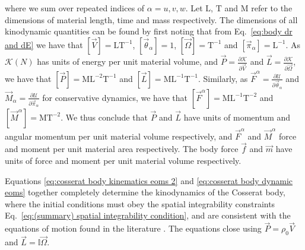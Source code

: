 where we sum over repeated indices of $\alpha = u, v, w$. Let $\mathrm{L}$, $\mathrm{T}$ and $\mathrm{M}$ refer to the dimensions of material length, time and mass respectively. The dimensions of all kinodynamic quantities can be found by first noting that from Eq.~\ref{eq:body dr and dE} we have that $[\vec{V}] = \mathrm{L} \mathrm{T}^{-1}$, $[\vec{\theta}_\alpha] = 1$, $[\vec{\Omega}] = \mathrm{T}^{-1}$ and $[\vec{\pi}_\alpha] = \mathrm{L}^{-1}$. As $\mathcal{K}(N)$ has units of energy per unit material volume, and $\vec{P} = \frac{\partial \mathcal{K}}{\partial \vec{V}}$ and $\vec{L} = \frac{\partial \mathcal{K}}{\partial \vec{\Omega}}$, we have that $[\vec{P}] = \mathrm{M} \mathrm{L}^{-2} \mathrm{T}^{-1}$ and $[\vec{L}] = \mathrm{M} \mathrm{L}^{-1} \mathrm{T}^{-1}$. Similarly, as $\vec{F}^\alpha = \frac{\partial \mathcal{U}}{\partial \vec{\theta}_\alpha}$ and $\vec{M}_\alpha = \frac{\partial \mathcal{U}}{\partial \vec{\pi}_\alpha}$ for conservative dynamics, we have that $[\vec{F}^\alpha] = \mathrm{M} \mathrm{L}^{-1} \mathrm{T}^{-2}$ and $[\vec{M}^\alpha] = \mathrm{M} \mathrm{T}^{-2}$. We thus conclude that $\vec{P}$ and $\vec{L}$ have units of momentum and angular momentum per unit material volume respectively, and $\vec{F}^\alpha$ and $\vec{M}^\alpha$ force and moment per unit material area respectively. The body force $\vec{f}$ and $\vec{m}$ have units of force and moment per unit material volume respectively. 

Equations \ref{eq:cosserat body kinematics eoms 2} and \ref{eq:cosserat body dynamic eoms} together completely determine the kinodynamics of the Cosserat body,  where the initial conditions must obey the spatial integrability constraints Eq.~\ref{eq:(summary) spatial integrability condition}, and are consistent with the equations of motion found in the literature \citep{rubinCosseratRods2000}. The equations close using $\vec{P} = \rho_0 \vec{V}$ and $\vec{L} = \mathbb{I} \vec{\Omega}$.

